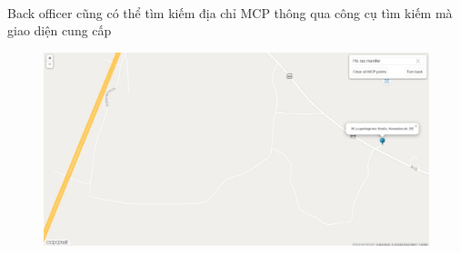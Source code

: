 \documentclass[a4paper]{article}
\begin{document}
\begin{enumerate}
\begin{figure}[!h]
\begin{center}
    \end{center}
\end{figure} 
\\
Back officer cũng có thể tìm kiếm địa chỉ MCP thông qua công cụ tìm kiếm mà giao diện cung cấp
                 \begin{figure}[!h]
    \begin{center}
      \includegraphics[width=5in]{Image/find_.jpg}
    \end{center}
\end{figure} 
\\


\end{enumerate}
\end{document}
